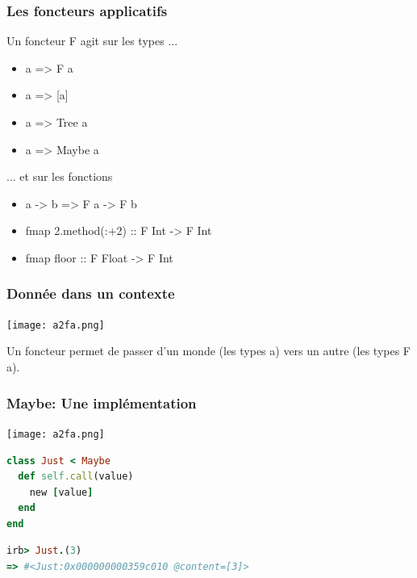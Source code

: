 \documentclass{beamer}
\begin{document}
\begin{frame}
\frametitle{Les foncteurs applicatifs}
\begin{block}{Un foncteur F agit sur les types ...}
\begin{itemize}
\item a => F a
\end{itemize}
\end{block}
\begin{exampleblock}{}
\begin{itemize}
\item a => [a]
\item a => Tree a
\item a => Maybe a
\end{itemize}
\end{exampleblock}

\pause

\begin{block}{... et sur les fonctions}
\begin{itemize}
\item a -> b => F a -> F b
\end{itemize}
\end{block}

\begin{exampleblock}{}
\begin{itemize}
\item fmap 2.method(:+2) :: F Int -> F Int
\item fmap floor :: F Float -> F Int
\end{itemize}
\end{exampleblock}
\end{frame}

\begin{frame}
\frametitle{Donnée dans un contexte}

\begin{center}
\texttt{[image: a2fa.png]}
\end{center}

\begin{block}{}
Un foncteur permet de passer d'un monde (les types a) vers un autre (les types F a).
\end{block}

\end{frame}

\begin{frame}[fragile]
\frametitle{Maybe: Une implémentation}
\begin{center}
\texttt{[image: a2fa.png]}
\end{center}
\begin{block}{}
\begin{lstlisting}[language=ruby,basicstyle=\ttfamily,keywordstyle=\color{red}]
class Just < Maybe
  def self.call(value)
    new [value]
  end
end
\end{lstlisting}
\end{block}
\begin{block}{}
\begin{lstlisting}[language=ruby,basicstyle=\ttfamily,keywordstyle=\color{red}]
irb> Just.(3)
=> #<Just:0x000000000359c010 @content=[3]>
\end{lstlisting}
\end{block}
\end{frame}
\end{document}
